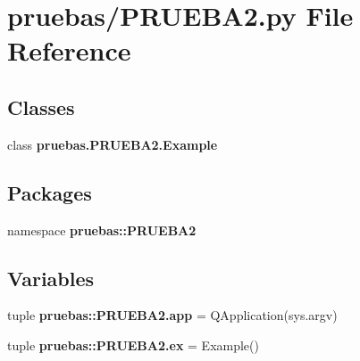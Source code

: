 \section{pruebas/\-P\-R\-U\-E\-B\-A2.py \-File \-Reference}
\label{_p_r_u_e_b_a2_8py}
\subsection*{\-Classes}
\begin{DoxyCompactItemize}
\item 
class {\bf pruebas.\-P\-R\-U\-E\-B\-A2.\-Example}
\end{DoxyCompactItemize}
\subsection*{\-Packages}
\begin{DoxyCompactItemize}
\item 
namespace {\bf pruebas\-::\-P\-R\-U\-E\-B\-A2}
\end{DoxyCompactItemize}
\subsection*{\-Variables}
\begin{DoxyCompactItemize}
\item 
tuple {\bf pruebas\-::\-P\-R\-U\-E\-B\-A2.\-app} = \-Q\-Application(sys.\-argv)
\item 
tuple {\bf pruebas\-::\-P\-R\-U\-E\-B\-A2.\-ex} = \-Example()
\end{DoxyCompactItemize}
